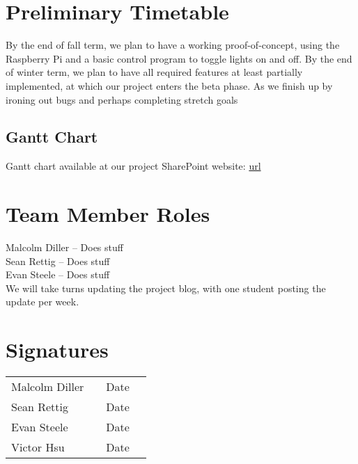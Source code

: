 \documentclass[12pt]{article}
\begin{document}
\section{Preliminary Timetable}

By the end of fall term, we plan to have a working proof-of-concept, using the Raspberry Pi and a basic control program to toggle lights on and off.  By the end of winter term, we plan to have all required features at least partially implemented, at which our project enters the beta phase.  As we finish up by ironing out bugs and perhaps completing stretch goals

\subsection{Gantt Chart}
Gantt chart available at our project SharePoint website: \url{url}
\begin{sidewaysfigure}
\end{sidewaysfigure}

\pagebreak

\section{Team Member Roles}

Malcolm Diller -- Does stuff\\
Sean Rettig -- Does stuff\\
Evan Steele -- Does stuff\\

We will take turns updating the project blog, with one student posting the
update per week.

\section{Signatures}

\begin{tabular}{l l l l} Malcolm Diller & \underline{\hspace{6cm}} & Date
\underline{\hspace{2cm}}\\ Sean Rettig & \underline{\hspace{6cm}} & Date
\underline{\hspace{2cm}}\\ Evan Steele & \underline{\hspace{6cm}} & Date
\underline{\hspace{2cm}}\\ Victor Hsu & \underline{\hspace{6cm}} & Date
\underline{\hspace{2cm}} \end{tabular}
    
\end{document}
